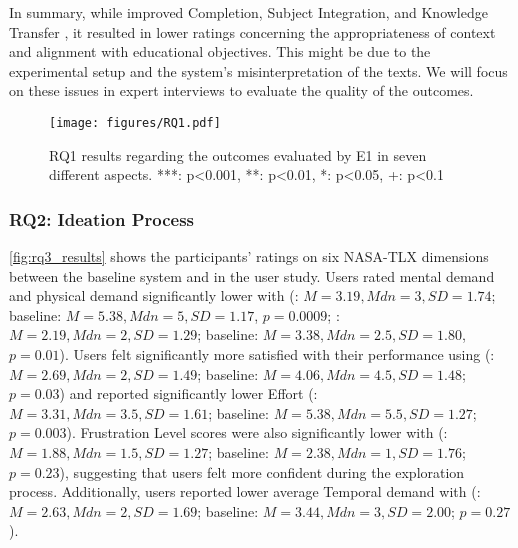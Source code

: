 In summary, while \name{} improved Completion, Subject Integration, and Knowledge Transfer , it resulted in lower ratings concerning the appropriateness of context and alignment with educational objectives. 
This might be due to the experimental setup and the system's misinterpretation of the texts. We will focus on these issues in expert interviews to evaluate the quality of the outcomes.

\begin{figure}[]
  \centering
  \texttt{[image: figures/RQ1.pdf]}
  \caption{RQ1 results regarding the outcomes evaluated by E1 in seven different aspects. ***: p<0.001, **: p<0.01, *: p<0.05, +: p<0.1}
  \label{fig:rq1_results}
\end{figure}

\subsubsection{RQ2: Ideation Process}
\autoref{fig:rq3_results} shows the participants' ratings on six NASA-TLX dimensions between the baseline system and \name{} in the user study. 
Users rated mental demand and physical demand significantly lower with \name{} (\name{}: $M = 3.19, Mdn=3, SD = 1.74$; baseline: $M = 5.38, Mdn=5, SD = 1.17$, $p=0.0009$; \name{}: $M = 2.19, Mdn=2, SD = 1.29$; baseline: $M = 3.38, Mdn=2.5, SD = 1.80$, $p=0.01$). Users felt significantly more satisfied with their performance using \name{} (\name{}: $M = 2.69, Mdn=2, SD = 1.49$; baseline: $M = 4.06, Mdn=4.5, SD = 1.48$; $p = 0.03$) and reported significantly lower Effort (\name{}: $M = 3.31, Mdn=3.5, SD = 1.61$; baseline: $M = 5.38, Mdn=5.5, SD = 1.27$; $p = 0.003$). Frustration Level scores were also significantly lower with \name{} (\name{}: $M = 1.88, Mdn=1.5, SD = 1.27$; baseline: $M = 2.38, Mdn=1, SD = 1.76$; $p = 0.23$), suggesting that users felt more confident during the exploration process. Additionally, users reported lower average Temporal demand with \name{} (\name{}: $M = 2.63, Mdn=2, SD = 1.69$; baseline: $M = 3.44, Mdn=3, SD = 2.00$; $p = 0.27$). 

